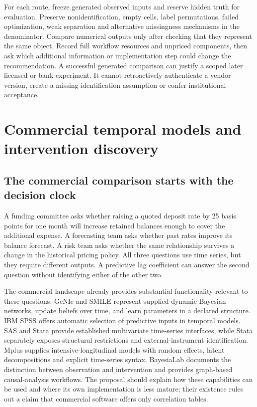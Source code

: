 For each route, freeze generated observed inputs and reserve hidden
truth for evaluation. Preserve nonidentification, empty cells, label
permutations, failed optimization, weak separation and alternative
missingness mechanisms in the denominator. Compare numerical outputs
only after checking that they represent the same object. Record full
workflow resources and unpriced components, then ask which additional
information or implementation step could change the recommendation. A
successful generated comparison can justify a scoped later licensed or
bank experiment. It cannot retroactively authenticate a vendor version,
create a missing identification assumption or confer institutional
acceptance.


\hypertarget{commercial-temporal-models-and-intervention-discovery}{%
\section{Commercial temporal models and intervention
discovery}\label{commercial-temporal-models-and-intervention-discovery}}

\label{exec13:commercial-temporal}

\hypertarget{the-commercial-comparison-starts-with-the-decision-clock}{%
\subsection{The commercial comparison starts with the decision
clock}\label{the-commercial-comparison-starts-with-the-decision-clock}}

A funding committee asks whether raising a quoted deposit rate by 25
basis points for one month will increase retained balances enough to
cover the additional expense. A forecasting team asks whether past rates
improve its balance forecast. A risk team asks whether the same
relationship survives a change in the historical pricing policy. All
three questions use time series, but they require different outputs. A
predictive lag coefficient can answer the second question without
identifying either of the other two.

The commercial landscape already provides substantial functionality
relevant to these questions. GeNIe and SMILE represent supplied dynamic
Bayesian networks, update beliefs over time, and learn parameters in a
declared structure. IBM SPSS offers automatic selection of predictive
inputs in temporal models. SAS and Stata provide established
multivariate time-series interfaces, while Stata separately exposes
structural restrictions and external-instrument identification. Mplus
supplies intensive-longitudinal models with random effects, latent
decompositions and explicit time-series syntax. BayesiaLab documents the
distinction between observation and intervention and provides
graph-based causal-analysis workflows. The proposal should explain how
these capabilities can be used and where its own implementation is less
mature; their existence rules out a claim that commercial software
offers only correlation tables.

